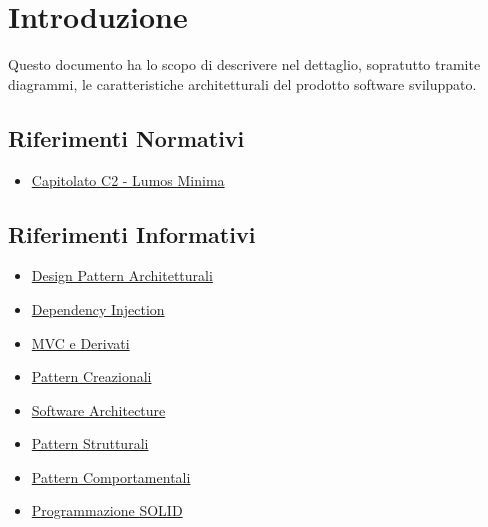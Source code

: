 \documentclass[a4paper, 12pt]{article}
\begin{document}
\makeindexdetails
\makefrontpage \makeversioni
\tableofcontents
\newpage
\clearpage
{}
\newpage
\section{Introduzione}
Questo documento ha lo scopo di descrivere nel dettaglio, sopratutto tramite diagrammi, le caratteristiche architetturali del prodotto software sviluppato.
\subsection{Riferimenti Normativi}
\begin{itemize}
    \item \href{https://www.math.unipd.it/~tullio/IS-1/2022/Progetto/C2.pdf}{Capitolato C2 - Lumos Minima}
\end{itemize}

\subsection{Riferimenti Informativi}
\begin{itemize}
    \item \href{https://www.math.unipd.it/~rcardin/swea/2022/Software%20Architecture%20Patterns.pdf}{Design Pattern Architetturali}
    \item \href{https://www.math.unipd.it/~rcardin/swea/2022/Design%20Pattern%20Architetturali%20-%20Dependency%20Injection.pdf}{Dependency Injection}
    \item \href{https://www.math.unipd.it/~rcardin/sweb/2022/L02.pdf}{MVC e Derivati}
    \item \href{https://www.math.unipd.it/~rcardin/swea/2022/Design%20Pattern%20Creazionali.pdf}{Pattern Creazionali}
    \item \href{http://www.math.unipd.it/~tullio/IS-1/2006/Approfondimenti/SEI-Software_Architectures.pdf}{Software Architecture}
    \item \href{https://www.math.unipd.it/~rcardin/swea/2022/Design%20Pattern%20Strutturali.pdf}{Pattern Strutturali}
    \item \href{https://www.math.unipd.it/~rcardin/swea/2021/Design%20Pattern%20Comportamentali_4x4.pdf}{Pattern Comportamentali}
    \item \href{https://www.math.unipd.it/~rcardin/swea/2021/SOLID%20Principles%20of%20Object-Oriented%20Design_4x4.pdf}{Programmazione SOLID}
\end{itemize}
\end{document}

